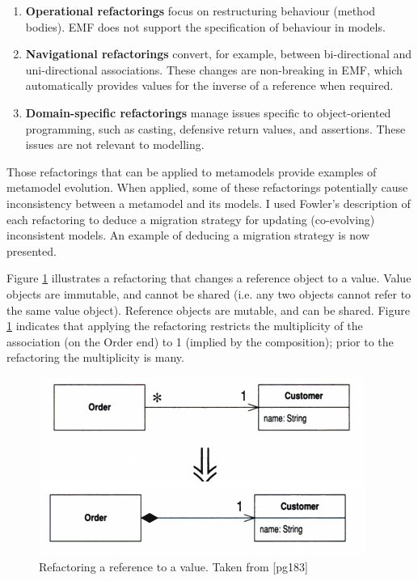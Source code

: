 \begin{enumerate}
	\item \textbf{Operational refactorings} focus on restructuring behaviour (method bodies). EMF does not support the specification of behaviour in models.
	\item \textbf{Navigational refactorings} convert, for example, between bi-directional and uni-directional associations. These changes are non-breaking in EMF, which automatically provides values for the inverse of a reference when required.
	\item \textbf{Domain-specific refactorings} manage issues specific to object-oriented programming, such as casting, defensive return values, and assertions. These issues are not relevant to modelling.
\end{enumerate}

Those refactorings that can be applied to metamodels provide examples of metamodel evolution. When applied, some of these refactorings potentially cause inconsistency between a metamodel and its models. I used Fowler's description of each refactoring to deduce a migration strategy for updating (co-evolving) inconsistent models. An example of deducing a migration strategy is now presented.

Figure \ref{fig:refactoring} illustrates a refactoring that changes a reference object to a value. Value objects are immutable, and cannot be shared (i.e. any two objects cannot refer to the same value object). Reference objects are mutable, and can be shared. Figure \ref{fig:refactoring} indicates that applying the refactoring restricts the multiplicity of the association (on the Order end) to 1 (implied by the composition); prior to the refactoring the multiplicity is many.

\begin{figure}[htbp]
  \begin{center}
    \leavevmode
    \includegraphics[scale=0.5]{refactoring.png}
  \end{center}
  \caption{Refactoring a reference to a value. Taken from \cite{fowler99refactoring}[pg183]}
  \label{fig:refactoring}
\end{figure}

